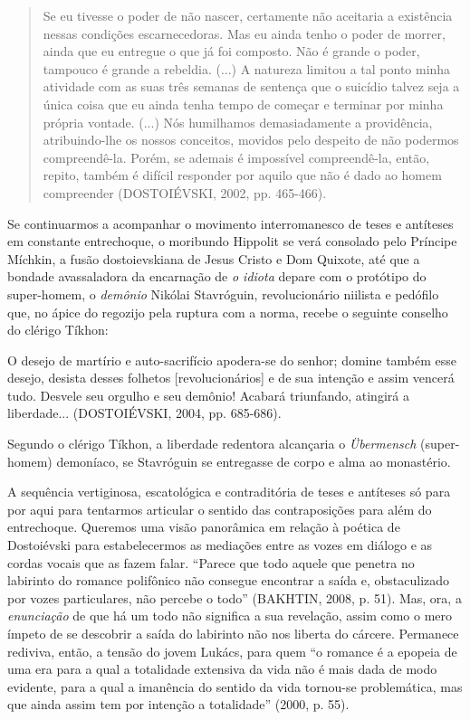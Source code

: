 \begin{quote}
Se eu tivesse o poder de não nascer, certamente não aceitaria a
existência nessas condições escarnecedoras. Mas eu ainda tenho o poder
de morrer, ainda que eu entregue o que já foi composto. Não é grande o
poder, tampouco é grande a rebeldia. (...) A natureza limitou a tal
ponto minha atividade com as suas três semanas de sentença que o
suicídio talvez seja a única coisa que eu ainda tenha tempo de começar e
terminar por minha própria vontade. (...) Nós humilhamos demasiadamente
a providência, atribuindo-lhe os nossos conceitos, movidos pelo despeito
de não podermos compreendê-la. Porém, se ademais é impossível
compreendê-la, então, repito, também é difícil responder por aquilo que
não é dado ao homem compreender (DOSTOIÉVSKI, 2002, pp. 465-466).
\end{quote}

Se continuarmos a acompanhar o movimento interromanesco de teses e
antíteses em constante entrechoque, o moribundo Hippolit se verá
consolado pelo Príncipe Míchkin, a fusão dostoievskiana de Jesus Cristo
e Dom Quixote, até que a bondade avassaladora da encarnação de \emph{o
idiota} depare com o protótipo do super-homem, o \emph{demônio} Nikólai
Stavróguin, revolucionário niilista e pedófilo que, no ápice do regozijo
pela ruptura com a norma, recebe o seguinte conselho do clérigo Tíkhon:

O desejo de martírio e auto-sacrifício apodera-se do senhor; domine
também esse desejo, desista desses folhetos {[}revolucionários{]} e de
sua intenção e assim vencerá tudo. Desvele seu orgulho e seu demônio!
Acabará triunfando, atingirá a liberdade... (DOSTOIÉVSKI, 2004, pp.
685-686).

Segundo o clérigo Tíkhon, a liberdade redentora alcançaria o
\emph{Übermensch} (super-homem) demoníaco, se Stavróguin se entregasse
de corpo e alma ao monastério.

A sequência vertiginosa, escatológica e contraditória de teses e
antíteses só para por aqui para tentarmos articular o sentido das
contraposições para além do entrechoque. Queremos uma visão panorâmica
em relação à poética de Dostoiévski para estabelecermos as mediações
entre as vozes em diálogo e as cordas vocais que as fazem falar.
``Parece que todo aquele que penetra no labirinto do romance polifônico
não consegue encontrar a saída e, obstaculizado por vozes particulares,
não percebe o todo'' (BAKHTIN, 2008, p. 51). Mas, ora, a
\emph{enunciação} de que há um todo não significa a sua revelação, assim
como o mero ímpeto de se descobrir a saída do labirinto não nos liberta
do cárcere. Permanece rediviva, então, a tensão do jovem Lukács, para
quem ``o romance é a epopeia de uma era para a qual a totalidade
extensiva da vida não é mais dada de modo evidente, para a qual a
imanência do sentido da vida tornou-se problemática, mas que ainda assim
tem por intenção a totalidade'' (2000, p. 55).

